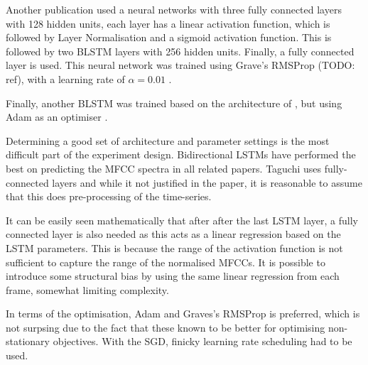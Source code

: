 \documentclass[a4paper]{article}
\begin{document}
Another publication \cite{Taguchi} used a neural networks with three fully
connected layers with 128 hidden units, each layer has a linear activation
function, which is followed by Layer Normalisation and a sigmoid activation
function. This is followed by two BLSTM layers with 256 hidden units. Finally,
a fully connected layer is used. This neural network was trained using Grave's RMSProp (TODO: ref),
with a learning rate of \( \alpha = 0.01 \) .

Finally, another BLSTM was trained based on the architecture of
\cite{Liu2018}, but using Adam as an optimiser \cite{Kingma2015}.

Determining a good set of architecture and parameter settings is the most difficult part of
the experiment design. Bidirectional LSTMs have performed the best on predicting the MFCC spectra in
all related papers. Taguchi uses fully-connected layers and while it not justified in the paper, it
is reasonable to assume that this does pre-processing of the time-series. 

It can be easily seen mathematically that after after the last LSTM layer, a fully connected layer is also needed as this acts as a linear regression based on the LSTM parameters. This is because the range of the activation function is not sufficient to capture the range of the normalised MFCCs. It is possible to introduce some structural bias by using the same linear regression from each frame, somewhat limiting complexity. 

In terms of the optimisation, Adam and Graves's RMSProp is preferred, which is not surpsing due to the
fact that these known to be better for optimising non-stationary objectives. With the SGD, finicky
learning rate scheduling had to be used.
\end{document}
